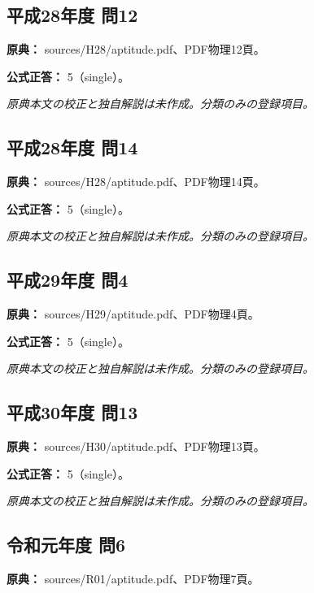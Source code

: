 \subsection{平成28年度 問12}
\label{q:h28-reg-apt-12}

\noindent\textbf{原典：} sources/H28/aptitude.pdf、PDF物理12頁。

\textbf{公式正答：} 5（single）。

\par\textit{原典本文の校正と独自解説は未作成。分類のみの登録項目。}

\subsection{平成28年度 問14}
\label{q:h28-reg-apt-14}

\noindent\textbf{原典：} sources/H28/aptitude.pdf、PDF物理14頁。

\textbf{公式正答：} 5（single）。

\par\textit{原典本文の校正と独自解説は未作成。分類のみの登録項目。}

\subsection{平成29年度 問4}
\label{q:h29-reg-apt-04}

\noindent\textbf{原典：} sources/H29/aptitude.pdf、PDF物理4頁。

\textbf{公式正答：} 5（single）。

\par\textit{原典本文の校正と独自解説は未作成。分類のみの登録項目。}

\subsection{平成30年度 問13}
\label{q:h30-reg-apt-13}

\noindent\textbf{原典：} sources/H30/aptitude.pdf、PDF物理13頁。

\textbf{公式正答：} 5（single）。

\par\textit{原典本文の校正と独自解説は未作成。分類のみの登録項目。}

\subsection{令和元年度 問6}
\label{q:r01-reg-apt-06}

\noindent\textbf{原典：} sources/R01/aptitude.pdf、PDF物理7頁。

